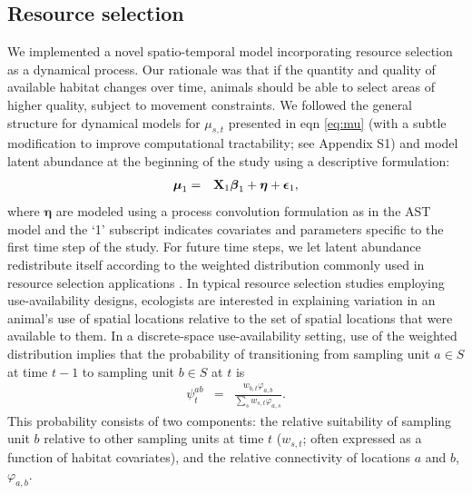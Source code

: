 \documentclass[times,mee,doublespace,]{besauth2}
\begin{document}
\subsection{Resource selection}

We implemented a novel spatio-temporal model incorporating resource selection as a dynamical process.  Our rationale was that if the quantity and quality of available habitat changes over time, animals should be able to select areas of higher quality, subject to movement constraints.
We followed the general structure for dynamical models for $\mu_{s,t}$ presented in eqn \ref{eq:mu} (with a subtle modification to improve computational tractability; see Appendix S1) and model latent abundance at the beginning of the study using a descriptive formulation:
\begin{eqnarray*}
  \boldsymbol{\mu}_{1} & = & {\bf X}_{1} \boldsymbol{\beta}_1 + \boldsymbol{\eta} + \boldsymbol{\epsilon}_1,
\end{eqnarray*}
where $\boldsymbol{\eta}$ are modeled using a process convolution formulation as in the AST model and the `1' subscript indicates covariates and parameters specific to the first time step of the study.  For future time steps, we let latent abundance redistribute itself according to the weighted distribution commonly used in resource selection applications \citep[cf.][]{PatilRao1978,LeleKeim2006}.  In typical resource selection studies employing use-availability designs, ecologists are interested in explaining variation in an animal's use of spatial locations relative to the set of spatial locations that were available to them.  In a discrete-space use-availability setting, use of the weighted distribution implies that the probability of transitioning from sampling unit $a \in S$ at time $t-1$ to sampling unit $b \in S$ at $t$ is
\begin{eqnarray}
  \psi^{ab}_t & = & \frac{w_{b,t} \varphi_{a,b}}{\sum_s w_{s,t} \varphi_{a,s}}. \label{eq:psi}
\end{eqnarray}
This probability consists of two components: the relative suitability of sampling unit $b$ relative to other sampling units at time $t$ ($w_{s,t}$; often expressed as a function of habitat covariates), and the relative connectivity of locations $a$ and $b$, $\varphi_{a,b}$.
\end{document}

